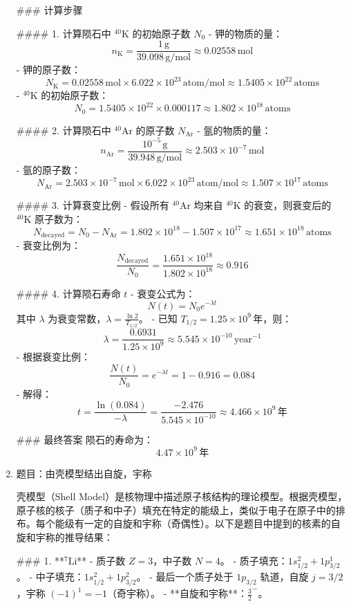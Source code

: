 \documentclass{article}
\begin{document}
\begin{enumerate}
### 计算步骤

#### 1. 计算陨石中 \(^{40}\text{K}\) 的初始原子数 \(N_0\)
- 钾的物质的量：
  \[
  n_{\text{K}} = \frac{1 \, \text{g}}{39.098 \, \text{g/mol}} \approx 0.02558 \, \text{mol}
  \]
- 钾的原子数：
  \[
  N_{\text{K}} = 0.02558 \, \text{mol} \times 6.022 \times 10^{23} \, \text{atom/mol} \approx 1.5405 \times 10^{22} \, \text{atoms}
  \]
- \(^{40}\text{K}\) 的初始原子数：
  \[
  N_0 = 1.5405 \times 10^{22} \times 0.000117 \approx 1.802 \times 10^{18} \, \text{atoms}
  \]


#### 2. 计算陨石中 \(^{40}\text{Ar}\) 的原子数 \(N_{\text{Ar}}\)
- 氩的物质的量：
  \[
  n_{\text{Ar}} = \frac{10^{-5} \, \text{g}}{39.948 \, \text{g/mol}} \approx 2.503 \times 10^{-7} \, \text{mol}
  \]
- 氩的原子数：
  \[
  N_{\text{Ar}} = 2.503 \times 10^{-7} \, \text{mol} \times 6.022 \times 10^{23} \, \text{atom/mol} \approx 1.507 \times 10^{17} \, \text{atoms}
  \]


#### 3. 计算衰变比例
- 假设所有 \(^{40}\text{Ar}\) 均来自 \(^{40}\text{K}\) 的衰变，则衰变后的 \(^{40}\text{K}\) 原子数为：
  \[
  N_{\text{decayed}} = N_0 - N_{\text{Ar}} = 1.802 \times 10^{18} - 1.507 \times 10^{17} \approx 1.651 \times 10^{18} \, \text{atoms}
  \]
- 衰变比例为：
  \[
  \frac{N_{\text{decayed}}}{N_0} = \frac{1.651 \times 10^{18}}{1.802 \times 10^{18}} \approx 0.916
  \]


#### 4. 计算陨石寿命 \(t\)
- 衰变公式为：
  \[
  N(t) = N_0 e^{-\lambda t}
  \]
  其中 \(\lambda\) 为衰变常数，\(\lambda = \frac{\ln 2}{T_{1/2}}\)。
- 已知 \(T_{1/2} = 1.25 \times 10^9 \, \text{年}\)，则：
  \[
  \lambda = \frac{0.6931}{1.25 \times 10^9} \approx 5.545 \times 10^{-10} \, \text{year}^{-1}
  \]
- 根据衰变比例：
  \[
  \frac{N(t)}{N_0} = e^{-\lambda t} = 1 - 0.916 = 0.084
  \]
- 解得：
  \[
  t = \frac{\ln(0.084)}{-\lambda} = \frac{-2.476}{5.545 \times 10^{-10}} \approx 4.466 \times 10^9 \, \text{年}
  \]


### 最终答案
陨石的寿命为：
\[
\boxed{4.47 \times 10^9 \, \text{年}}
\]

\item 
题目：由壳模型结出自旋，宇称

壳模型（Shell Model）是核物理中描述原子核结构的理论模型。根据壳模型，原子核的核子（质子和中子）填充在特定的能级上，类似于电子在原子中的排布。每个能级有一定的自旋和宇称（奇偶性）。以下是题目中提到的核素的自旋和宇称的推导结果：


### 1. **\(^7\text{Li}\)**
- 质子数 \(Z = 3\)，中子数 \(N = 4\)。
- 质子填充：\(1s_{1/2}^2 + 1p_{3/2}^1\)。
- 中子填充：\(1s_{1/2}^2 + 1p_{3/2}^2\)。
- 最后一个质子处于 \(1p_{3/2}\) 轨道，自旋 \(j = 3/2\)，宇称 \((-1)^1 = -1\)（奇宇称）。
- **自旋和宇称**：\(\boxed{\frac{3}{2}^-}\)。



\end{enumerate}
\end{document}
